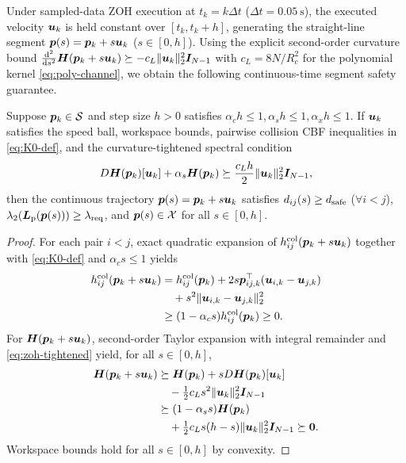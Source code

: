 Under sampled-data ZOH execution at $t_k=k\Delta t$ ($\Delta t=0.05\ \mathrm s$), the executed velocity $\boldsymbol{u}_k$ is held constant over $[t_k,t_k+h]$, generating the straight-line segment $\boldsymbol{p}(s)=\boldsymbol{p}_k+s\boldsymbol{u}_k$ ($s\in[0,h]$). Using the explicit second-order curvature bound $\frac{\mathrm d^2}{\mathrm ds^2}\boldsymbol{H}(\boldsymbol{p}_k+s\boldsymbol{u}_k)\succeq -c_L\lVert\boldsymbol{u}_k\rVert_2^2\boldsymbol{I}_{N-1}$ with $c_L=8N/R_c^2$ for the polynomial kernel \eqref{eq:poly-channel}, we obtain the following continuous-time segment safety guarantee.

\begin{theorem}\label{thm:zoh-safe}
Suppose $\boldsymbol{p}_k\in\mathcal S$ and step size $h>0$ satisfies $\alpha_c h\le 1,\alpha_s h\le 1,\alpha_x h\le 1$. If $\boldsymbol{u}_k$ satisfies the speed ball, workspace bounds, pairwise collision CBF inequalities in \eqref{eq:K0-def}, and the curvature-tightened spectral condition
\begin{equation}
 D\boldsymbol{H}(\boldsymbol{p}_k)[\boldsymbol{u}_k]+\alpha_s\boldsymbol{H}(\boldsymbol{p}_k)\succeq\frac{c_L h}{2}\lVert\boldsymbol{u}_k\rVert_2^2\boldsymbol{I}_{N-1},
 \label{eq:zoh-tightened}
\end{equation}
then the continuous trajectory $\boldsymbol{p}(s)=\boldsymbol{p}_k+s\boldsymbol{u}_k$ satisfies $d_{ij}(s)\ge d_{\mathrm{safe}}$ ($\forall i<j$), $\lambda_2(\boldsymbol{L}_{\mathrm{p}}(\boldsymbol{p}(s)))\ge\lambda_{\mathrm{req}}$, and $\boldsymbol{p}(s)\in\mathcal X$ for all $s\in[0,h]$.
\end{theorem}
\begin{proof}
For each pair $i<j$, exact quadratic expansion of $h_{ij}^{\mathrm{col}}(\boldsymbol{p}_k+s\boldsymbol{u}_k)$ together with \eqref{eq:K0-def} and $\alpha_c s\le 1$ yields
\begin{equation}
\begin{split}
 h_{ij}^{\mathrm{col}}(\boldsymbol{p}_k+s\boldsymbol{u}_k)&=h_{ij}^{\mathrm{col}}(\boldsymbol{p}_k)+2s\boldsymbol{p}_{ij,k}^{\top}(\boldsymbol{u}_{i,k}-\boldsymbol{u}_{j,k})\\
 &\quad+s^2\lVert\boldsymbol{u}_{i,k}-\boldsymbol{u}_{j,k}\rVert_2^2\\
 &\ge(1-\alpha_c s)h_{ij}^{\mathrm{col}}(\boldsymbol{p}_k)\ge 0.
\end{split}
\end{equation}
For $\boldsymbol{H}(\boldsymbol{p}_k+s\boldsymbol{u}_k)$, second-order Taylor expansion with integral remainder and \eqref{eq:zoh-tightened} yield, for all $s\in[0,h]$,
\begin{equation}
\begin{split}
 \boldsymbol{H}(\boldsymbol{p}_k+s\boldsymbol{u}_k)&\succeq\boldsymbol{H}(\boldsymbol{p}_k)+sD\boldsymbol{H}(\boldsymbol{p}_k)[\boldsymbol{u}_k]\\
 &\quad-\tfrac12 c_L s^2\lVert\boldsymbol{u}_k\rVert_2^2\boldsymbol{I}_{N-1}\\
 &\succeq(1-\alpha_s s)\boldsymbol{H}(\boldsymbol{p}_k)\\
 &\quad+\tfrac12 c_L s(h-s)\lVert\boldsymbol{u}_k\rVert_2^2\boldsymbol{I}_{N-1}\succeq\boldsymbol 0.
\end{split}
\end{equation}
Workspace bounds hold for all $s\in[0,h]$ by convexity.
\end{proof}

